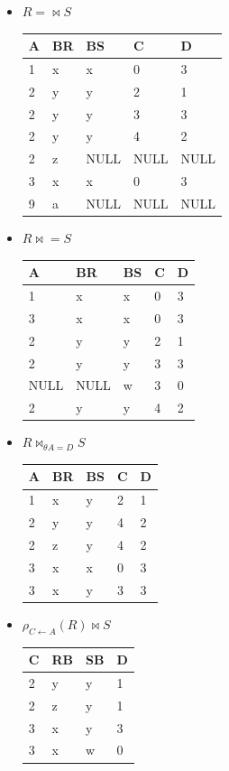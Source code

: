 \documentclass[12pt,a4paper]{article}
\begin{document}
\begin{enumerate}
\begin{itemize}
			\pagebreak
			\item $R =\bowtie  S$\\
				\begin{tabular}{|l|l|l|l|l|}
					\hline
					A	&BR	&BS	&C	&D\\
					\hline
					1	&x	&x		&0		&3\\
					2	&y	&y		&2		&1\\
					2	&y	&y		&3		&3\\
					2	&y	&y		&4		&2\\
					2	&z	&NULL	&NULL	&NULL\\
					3	&x	&x		&0		&3\\
					9	&a	&NULL	&NULL	&NULL\\
					\hline
				\end{tabular}

			\item $R \bowtie= S$\\
				\begin{tabular}{|l|l|l|l|l|}
					\hline
					A	&BR	&BS	&C	&D\\
					\hline
					1	&x	&x	&0	&3\\
					3	&x	&x	&0	&3\\
					2	&y	&y	&2	&1\\
					2	&y	&y	&3	&3\\
					NULL	&NULL	&w	&3	&0\\
					2	&y	&y	&4	&2\\
					\hline
				\end{tabular}

			\item $R \bowtie_{\theta A=D} S$\\
				\begin{tabular}{|l|l|l|l|l|}
					\hline
					A	&BR	&BS	&C	&D\\
					\hline
					1	&x	&y	&2	&1\\
					2	&y	&y	&4	&2\\
					2	&z	&y	&4	&2\\
					3	&x	&x	&0	&3\\
					3	&x	&y	&3	&3\\
					\hline
				\end{tabular}

			\item $\rho_{C \leftarrow A}(R) \bowtie S$\\
				\begin{tabular}{|l|l|l|l|}
					\hline
					C	&RB	&SB	&D\\
					\hline
					2	&y	&y	&1\\
					2	&z	&y	&1\\
					3	&x	&y	&3\\
					3	&x	&w	&0\\
					\hline
				\end{tabular}


\end{itemize}
\end{enumerate}
\end{document}
